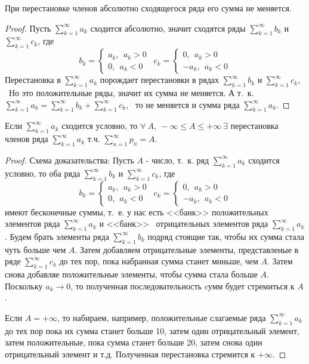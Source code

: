 \documentclass[../../main.tex]{subfiles}
\begin{document}
\begin{crl*}
	При перестановке членов абсолютно сходящегося ряда его сумма не меняется.
\end{crl*}
\begin{proof}
		Пусть $\sum\limits_{k = 1}^{\infty} a_k$ сходится абсолютно,
		значит сходятся ряды $\sum\limits_{k = 1}^{\infty} b_k$ и
		$\sum\limits_{k = 1}^{\infty} c_k$, где\[b_k = \begin{cases}
			a_k, \ \ a_k > 0\\
			0, \ \ a_k < 0
		  \end{cases} \ \
		 c_k = \begin{cases}
			0, \ \ a_k > 0\\
			-a_k, \ \ a_k < 0
		  \end{cases}\]
  Перестановка в $\sum\limits_{k = 1}^{\infty} a_k$ порождает перестановки
  в рядах  $\sum\limits_{k = 1}^{\infty} b_k$ и
  $\sum\limits_{k = 1}^{\infty} c_k$, \ Но это положительные ряды,
  значит их сумма не меняется. А т.~к. $\sum\limits_{k = 1}^{\infty} a_k
   = \sum\limits_{k = 1}^{\infty} b_k + \sum\limits_{k = 1}^{\infty} c_k$,
   \ то не меняется и сумма ряда $\sum\limits_{k = 1}^{\infty} a_k$.
\end{proof}
\begin{thm}
	Если $\sum\limits_{k = 1}^{\infty} a_k$ сходится условно, то
	$\forall \ A, \ - \infty \leq A \leq + \infty \ \exists$
	перестановка членов ряда $\sum\limits_{k = 1}^{\infty} a_k$ т.ч.
	$\sum\limits_{n = 1}^{\infty} p_n = A$.
	\begin{proof}
		Схема доказательства: Пусть $A$ - число, т.~к. ряд
		$\sum\limits_{k = 1}^{\infty} a_k$ сходится условно, то оба ряда
		$\sum\limits_{k = 1}^{\infty} b_k$ и
		$\sum\limits_{k = 1}^{\infty} c_k$, где
		\[b_k = \begin{cases}
			a_k, \ \ a_k > 0\\
			0, \ \ a_k < 0
		  \end{cases} \ \
		 c_k = \begin{cases}
			0, \ \ a_k > 0\\
			-a_k, \ \ a_k < 0
		  \end{cases}\]
		  имеют бесконечные суммы, т.~е. у нас есть <<банк>> положительных
		  элементов	ряда $\sum\limits_{k = 1}^{\infty} a_k$ и <<банк>> \
		  отрицательных элементов ряда $\sum\limits_{k = 1}^{\infty} a_k$.
		  Будем брать элементы ряда $\sum\limits_{k = 1}^{\infty} b_k$
		  подряд стоящие так, чтобы их сумма стала чуть больше чем $A$.
		  Затем добавляем отрицательные элементы, представленые в ряде
		  $\sum\limits_{k = 1}^{\infty} c_k$ до тех пор, пока набранная
		  сумма станет мнньше, чем $A$. Затем снова добавляе положительные
		  элементы, чтобы сумма стала больше $A$. Поскольку $a_k \to 0$,
		  то полученная последовательность cумм будет стремиться к $A$.

		  Если $A = +\infty$, то набираем, например, положительные
		  слагаемые ряда $\sum\limits_{k = 1}^{\infty} a_k$ до тех пор
		  пока их сумма станет больше 10, затем один отрицательный элемент,
		  затем положительные, пока сумма станет больше 20, затем снова один
		  отрицательный элемент и т.д. Полученная перестановка стремится к
		  $+ \infty$.
	\end{proof}
\end{thm}
\end{document}
